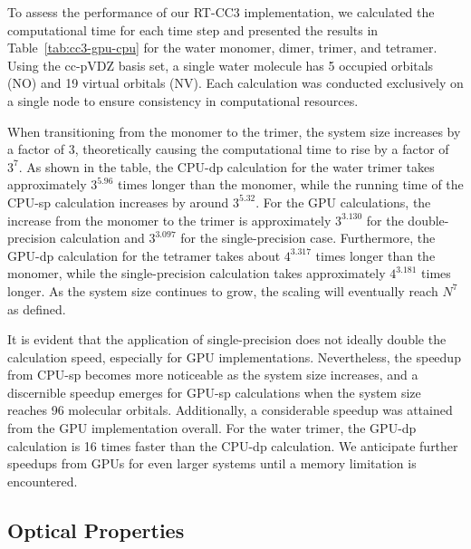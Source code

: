 To assess the performance of our RT-CC3 implementation, we calculated the computational time for each time step and presented the results in Table~\ref{tab:cc3-gpu-cpu} for the water monomer, dimer, trimer, and tetramer. Using the cc-pVDZ basis set, a single water molecule has 5 occupied orbitals (NO) and 19 virtual orbitals (NV). Each calculation was conducted exclusively on a single node to ensure consistency in computational resources.

When transitioning from the monomer to the trimer, the system size increases by a factor of 3, theoretically causing the computational time to rise by a factor of $3^7$. As shown in the table, the CPU-dp calculation for the water trimer takes approximately $3^{5.96}$ times longer than the monomer, while the running time of the CPU-sp calculation increases by around $3^{5.32}$. For the GPU calculations, the increase from the monomer to the trimer is approximately $3^{3.130}$ for the double-precision calculation and $3^{3.097}$ for the single-precision case. Furthermore, the GPU-dp calculation for the tetramer takes about $4^{3.317}$ times longer than the monomer, while the single-precision calculation takes approximately $4^{3.181}$ times longer. As the system size continues to grow, the scaling will eventually reach $N^{7}$ as defined.

It is evident that the application of single-precision does not ideally double the calculation speed, especially for GPU implementations. Nevertheless, the speedup from CPU-sp becomes more noticeable as the system size increases, and a discernible speedup emerges for GPU-sp calculations when the system size reaches 96 molecular orbitals. Additionally, a considerable speedup was attained from the GPU implementation overall. For the water trimer, the GPU-dp calculation is 16 times faster than the CPU-dp calculation. We anticipate further speedups from GPUs for even larger systems until a memory limitation is encountered.

\subsection{Optical Properties}\label{results-cc3-2}
